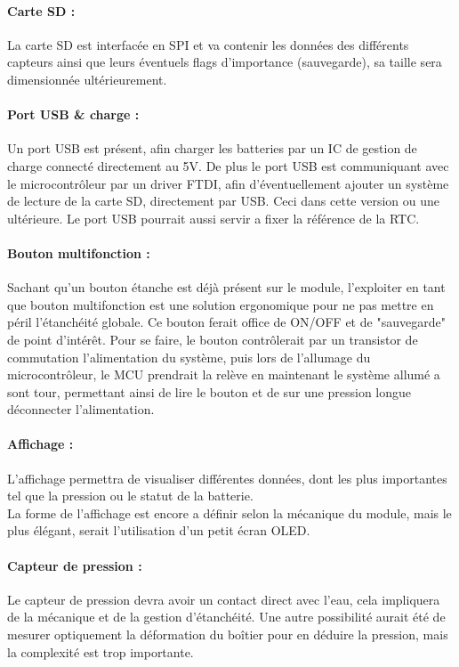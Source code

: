 {\paragraph{Carte SD :}
La carte SD est interfacée en SPI et va contenir les données des différents capteurs ainsi que leurs éventuels flags d'importance (sauvegarde), sa taille sera dimensionnée ultérieurement.\\

\paragraph{Port USB \& charge :}
Un port USB est présent, afin charger les batteries par un IC de gestion de charge connecté directement au 5V. De plus le port USB est communiquant avec le microcontrôleur par un driver FTDI, afin d'éventuellement ajouter un système de lecture de la carte SD, directement par USB. Ceci dans cette version ou une ultérieure. Le port USB pourrait aussi servir a fixer la référence de la RTC. \\

\paragraph{Bouton multifonction :}
Sachant qu'un bouton étanche est déjà présent sur le module, l'exploiter en tant que bouton multifonction est une solution ergonomique pour ne pas mettre en péril l'étanchéité globale. Ce bouton ferait office de ON/OFF et de "sauvegarde" de point d'intérêt. Pour se faire, le bouton contrôlerait par un transistor de commutation l'alimentation du système, puis lors de l'allumage du microcontrôleur, le MCU prendrait la relève en maintenant le système allumé a sont tour, permettant ainsi de lire le bouton et de sur une pression longue déconnecter l'alimentation.\\

\paragraph{Affichage :}
L'affichage permettra de visualiser différentes données, dont les plus importantes tel que la pression ou le statut de la batterie. \\ La forme de l'affichage est encore a définir selon la mécanique du module, mais le plus élégant, serait l'utilisation d'un petit écran OLED.\\

\paragraph{Capteur de pression :}
Le capteur de pression devra avoir un contact direct avec l'eau, cela impliquera de la mécanique et de la gestion d'étanchéité. Une autre possibilité aurait été de mesurer optiquement la déformation du boîtier pour en déduire la pression, mais la complexité est trop importante.\\
}

